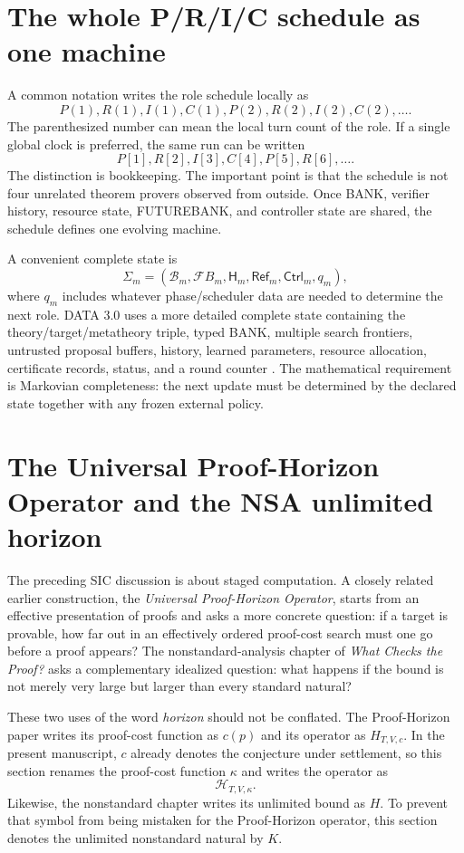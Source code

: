 \documentclass[11pt]{article}
\theoremstyle{definition}
\theoremstyle{remark}
\newcommand{\Bank}{\mathcal B}
\newcommand{\Future}{\mathcal F\!B}
\newcommand{\State}{\Sigma}
\begin{document}
\section{The whole P/R/I/C schedule as one machine}

A common notation writes the role schedule locally as
\[
P(1),R(1),I(1),C(1),P(2),R(2),I(2),C(2),\ldots.
\]
The parenthesized number can mean the local turn count of the role. If a single global clock is preferred, the same run can be written
\[
P[1],R[2],I[3],C[4],P[5],R[6],\ldots.
\]
The distinction is bookkeeping. The important point is that the schedule is not four unrelated theorem provers observed from outside. Once BANK, verifier history, resource state, FUTUREBANK, and controller state are shared, the schedule defines one evolving machine.

A convenient complete state is
\[
\State_m=(\Bank_m,\Future_m,\mathsf H_m,\mathsf{Ref}_m,\mathsf{Ctrl}_m,q_m),
\]
where $q_m$ includes whatever phase/scheduler data are needed to determine the next role. DATA 3.0 uses a more detailed complete state containing the theory/target/metatheory triple, typed BANK, multiple search frontiers, untrusted proposal buffers, history, learned parameters, resource allocation, certificate records, status, and a round counter \cite{Data3}. The mathematical requirement is Markovian completeness: the next update must be determined by the declared state together with any frozen external policy.


\section{The Universal Proof-Horizon Operator and the NSA unlimited horizon}

The preceding SIC discussion is about staged computation. A closely related earlier construction, the \emph{Universal Proof-Horizon Operator}, starts from an effective presentation of proofs and asks a more concrete question: if a target is provable, how far out in an effectively ordered proof-cost search must one go before a proof appears? \cite{ProofHorizon} The nonstandard-analysis chapter of \emph{What Checks the Proof?} asks a complementary idealized question: what happens if the bound is not merely very large but larger than every standard natural? \cite{WCTP}

These two uses of the word \emph{horizon} should not be conflated. The Proof-Horizon paper writes its proof-cost function as $c(p)$ and its operator as $H_{T,V,c}$. In the present manuscript, $c$ already denotes the conjecture under settlement, so this section renames the proof-cost function $\kappa$ and writes the operator as
\[
\mathcal H_{T,V,\kappa}.
\]
Likewise, the nonstandard chapter writes its unlimited bound as $H$. To prevent that symbol from being mistaken for the Proof-Horizon operator, this section denotes the unlimited nonstandard natural by $K$.
\end{document}
